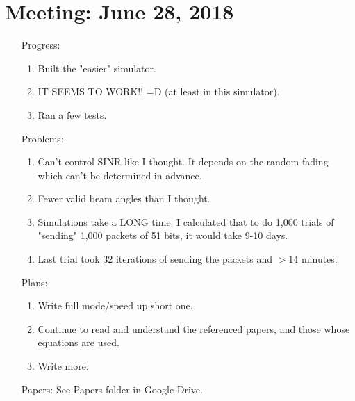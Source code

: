 \documentclass[11pt]{article}
\begin{document}
\section{Meeting: June 28, 2018}
\begin{itemize}
\item[Progress:]
\begin{enumerate}
\item Built the "easier" simulator.
\item IT SEEMS TO WORK!! =D (at least in this simulator).
\item Ran a few tests.
\end{enumerate}

\item[Problems:]
\begin{enumerate}
\item Can't control SINR like I thought.  It depends on the random fading which can't be determined in advance.
\item Fewer valid beam angles than I thought.
\item Simulations take a LONG time.  I calculated that to do 1,000 trials of "sending" 1,000 packets of 51 bits, it would take 9-10 days.
\item Last trial took 32 iterations of sending the packets and $>$14 minutes.
\end{enumerate}

\item[Plans:]
\begin{enumerate}
\item Write full mode/speed up short one.
\item Continue to read and understand the referenced papers, and those whose equations are used.
\item Write more.
\end{enumerate}

\item[Papers:]
See Papers folder in Google Drive.

\end{itemize}\newpage
\end{document}
